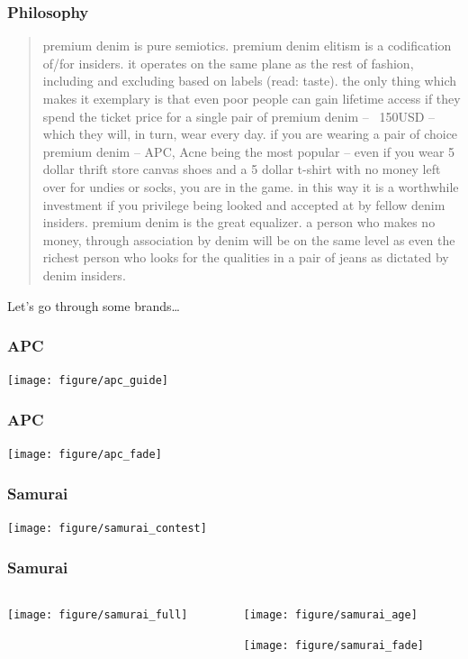 \documentclass{beamer}
\begin{document}
\begin{frame}
  \frametitle{Philosophy}
  \begin{footnotesize}
    \begin{quotation}
      premium denim is pure semiotics. premium denim elitism is a codification of/for insiders. it operates on the same plane as the rest of fashion, including and excluding based on labels (read: taste). the only thing which makes it exemplary is that even poor people can gain lifetime access if they spend the ticket price for a single pair of premium denim -- ~150USD -- which they will, in turn, wear every day. if you are wearing a pair of choice premium denim -- APC, Acne being the most popular -- even if you wear 5 dollar thrift store canvas shoes and a 5 dollar t-shirt with no money left over for undies or socks, you are in the game. in this way it is a worthwhile investment if you privilege being looked and accepted at by fellow denim insiders. premium denim is the great equalizer. a person who makes no money, through association by denim will be on the same level as even the richest person who looks for the qualities in a pair of jeans as dictated by denim insiders.

      \tiny{}
    \end{quotation}
  \end{footnotesize}
\end{frame}

\begin{frame}
  Let's go through some brands\dots

  \vspace{3cm}

  \tiny{}
\end{frame}

\begin{frame}
  \frametitle{APC}
  \texttt{[image: figure/apc\_guide]}
\end{frame}

\begin{frame}
  \frametitle{APC}
  \texttt{[image: figure/apc\_fade]}
\end{frame}

\begin{frame}
  \frametitle{Samurai}
  \texttt{[image: figure/samurai\_contest]}
\end{frame}

\begin{frame}
  \frametitle{Samurai}
  \begin{columns}
    \begin{column}{0.5\textwidth}
      \texttt{[image: figure/samurai\_full]}
    \end{column}
    \begin{column}{0.5\textwidth}
      \texttt{[image: figure/samurai\_age]}

      \texttt{[image: figure/samurai\_fade]}
    \end{column}
  \end{columns}
\end{frame}
\end{document}
